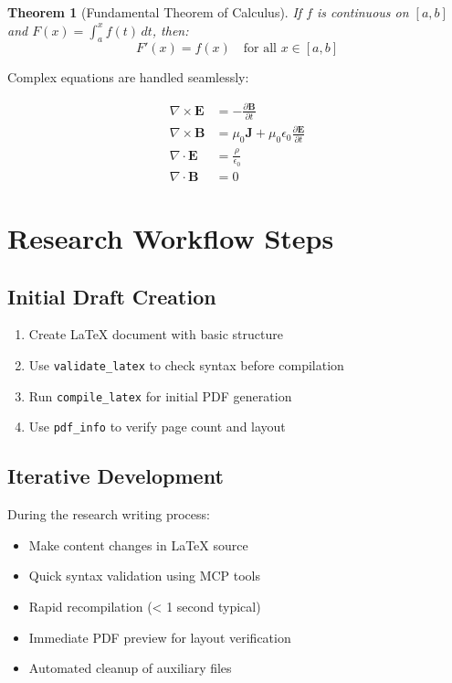 \documentclass[12pt]{article}
\newtheorem{theorem}{Theorem}
\begin{document}
\begin{theorem}[Fundamental Theorem of Calculus]
If $f$ is continuous on $[a,b]$ and $F(x) = \int_a^x f(t) \, dt$, then:
\begin{equation}
F'(x) = f(x) \quad \text{for all } x \in [a,b]
\end{equation}
\end{theorem}

Complex equations are handled seamlessly:

\begin{align}
\nabla \times \mathbf{E} &= -\frac{\partial \mathbf{B}}{\partial t} \\
\nabla \times \mathbf{B} &= \mu_0 \mathbf{J} + \mu_0 \epsilon_0 \frac{\partial \mathbf{E}}{\partial t} \\
\nabla \cdot \mathbf{E} &= \frac{\rho}{\epsilon_0} \\
\nabla \cdot \mathbf{B} &= 0
\end{align}

\section{Research Workflow Steps}

\subsection{Initial Draft Creation}

\begin{enumerate}
    \item Create LaTeX document with basic structure
    \item Use \texttt{validate\_latex} to check syntax before compilation
    \item Run \texttt{compile\_latex} for initial PDF generation
    \item Use \texttt{pdf\_info} to verify page count and layout
\end{enumerate}

\subsection{Iterative Development}

During the research writing process:

\begin{itemize}
    \item Make content changes in LaTeX source
    \item Quick syntax validation using MCP tools
    \item Rapid recompilation (< 1 second typical)
    \item Immediate PDF preview for layout verification
    \item Automated cleanup of auxiliary files
\end{itemize}
\end{document}
